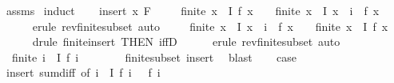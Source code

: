 \begin{isabellebody}
\ assms\isanewline
{}\isamarkupfalse%
\ induct\isanewline
\ \ \isamarkupfalse%
\ {\isacharparenleft}{\kern0pt}insert\ x\ F{\isacharparenright}{\kern0pt}\isanewline
\ \ \isamarkupfalse%
\ {}{\isacharcolon}{\kern0pt}\ {\isachardoublequoteopen}finite\ {\isacharbraceleft}{\kern0pt}x\ {\isasymin}\ I{\isachardot}{\kern0pt}\ f\ x\ {\isasymnoteq}\ {}{\isacharbraceright}{\kern0pt}\ {\isasymLongrightarrow}\ finite\ {\isacharbraceleft}{\kern0pt}x\ {\isasymin}\ I{\isachardot}{\kern0pt}\ x\ {\isasymnoteq}\ i\ {\isasymand}\ f\ x\ {\isasymnoteq}\ {}{\isacharbraceright}{\kern0pt}{\isachardoublequoteclose}\isanewline
\ \ \ \ \isamarkupfalse%
\ {\isacharparenleft}{\kern0pt}erule\ rev{\isacharunderscore}{\kern0pt}finite{\isacharunderscore}{\kern0pt}subset{\isacharparenright}{\kern0pt}\ auto\isanewline
\ \ \isamarkupfalse%
\ {}{\isacharcolon}{\kern0pt}\ {\isachardoublequoteopen}finite\ {\isacharbraceleft}{\kern0pt}x\ {\isasymin}\ I{\isachardot}{\kern0pt}\ x\ {\isasymnoteq}\ i\ {\isasymand}\ f\ x\ {\isasymnoteq}\ {}{\isacharbraceright}{\kern0pt}\ {\isasymLongrightarrow}\ finite\ {\isacharbraceleft}{\kern0pt}x\ {\isasymin}\ I{\isachardot}{\kern0pt}\ f\ x\ {\isasymnoteq}\ {}{\isacharbraceright}{\kern0pt}{\isachardoublequoteclose}\isanewline
\ \ \ \ \isamarkupfalse%
\ {\isacharparenleft}{\kern0pt}drule\ finite{\isacharunderscore}{\kern0pt}insert\ {\isacharbrackleft}{\kern0pt}THEN\ iffD{}{\isacharbrackright}{\kern0pt}{\isacharparenright}{\kern0pt}\isanewline
\ \ \ \ \isamarkupfalse%
\ {\isacharparenleft}{\kern0pt}erule\ rev{\isacharunderscore}{\kern0pt}finite{\isacharunderscore}{\kern0pt}subset{\isacharparenright}{\kern0pt}\ auto\isanewline
\ \ \isamarkupfalse%
\ {}{\isacharcolon}{\kern0pt}\ {\isachardoublequoteopen}finite\ {\isacharbraceleft}{\kern0pt}i\ {\isasymin}\ I{\isachardot}{\kern0pt}\ f\ i\ {\isasymnoteq}\ {}{\isacharbraceright}{\kern0pt}{\isachardoublequoteclose}\isanewline
\ \ \ \ \isamarkupfalse%
\ finite{\isacharunderscore}{\kern0pt}subset\ insert\ \isamarkupfalse%
\ blast\isanewline
\ \ \isamarkupfalse%
\ {\isacharquery}{\kern0pt}case\isanewline
\ \ \ \ \isamarkupfalse%
\ insert\ sum{\isacharunderscore}{\kern0pt}diff{}\ {\isacharbrackleft}{\kern0pt}of\ {\isachardoublequoteopen}{\isacharbraceleft}{\kern0pt}i\ {\isasymin}\ I{\isachardot}{\kern0pt}\ f\ i\ {\isasymnoteq}\ {}{\isacharbraceright}{\kern0pt}{\isachardoublequoteclose}\ f\ i{\isacharbrackright}{\kern0pt}\isanewline

\end{isabellebody}
